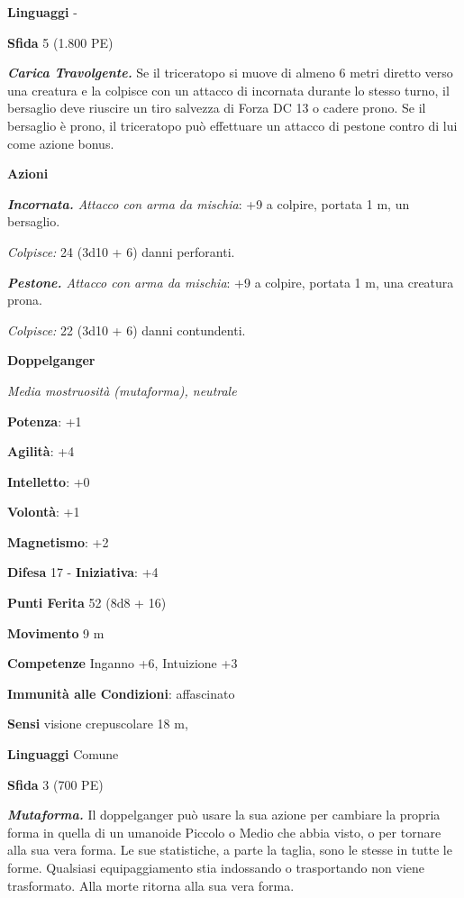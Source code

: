 \begin{multicols}{2}
\textbf{Linguaggi} -

\textbf{Sfida} 5 (1.800 PE)\smallskip

\emph{\textbf{Carica Travolgente.}} Se il triceratopo si muove di almeno
6 metri diretto verso una creatura e la colpisce con un attacco di
incornata durante lo stesso turno, il bersaglio deve riuscire un tiro
salvezza di Forza DC 13 o cadere prono. Se il bersaglio è prono, il
triceratopo può effettuare un attacco di pestone contro di lui come
azione bonus.

\smallskip\textbf{Azioni}

\emph{\textbf{Incornata.} Attacco con arma da mischia}: +9 a colpire,
portata 1 m, un bersaglio.

\emph{Colpisce:} 24 (3d10 + 6) danni perforanti.

\emph{\textbf{Pestone.} Attacco con arma da mischia}: +9 a colpire,
portata 1 m, una creatura prona.

\emph{Colpisce:} 22 (3d10 + 6) danni contundenti.



\textbf{Doppelganger}

\emph{Media mostruosità (mutaforma), neutrale}

\textbf{Potenza}: +1

\textbf{Agilità}: +4

\textbf{Intelletto}: +0

\textbf{Volontà}: +1

\textbf{Magnetismo}: +2

\textbf{Difesa} 17 - \textbf{Iniziativa}: +4

\textbf{Punti Ferita} 52 (8d8 + 16)

\textbf{Movimento} 9 m

\textbf{Competenze} Inganno +6, Intuizione +3

\textbf{Immunità alle Condizioni}: affascinato

\textbf{Sensi} visione crepuscolare 18 m, 

\textbf{Linguaggi} Comune

\textbf{Sfida} 3 (700 PE)\smallskip

\emph{\textbf{Mutaforma.}} Il doppelganger può usare la sua azione per
cambiare la propria forma in quella di un umanoide Piccolo o Medio che
abbia visto, o per tornare alla sua vera forma. Le sue statistiche, a
parte la taglia, sono le stesse in tutte le forme. Qualsiasi
equipaggiamento stia indossando o trasportando non viene trasformato.
Alla morte ritorna alla sua vera forma.


\end{multicols}
